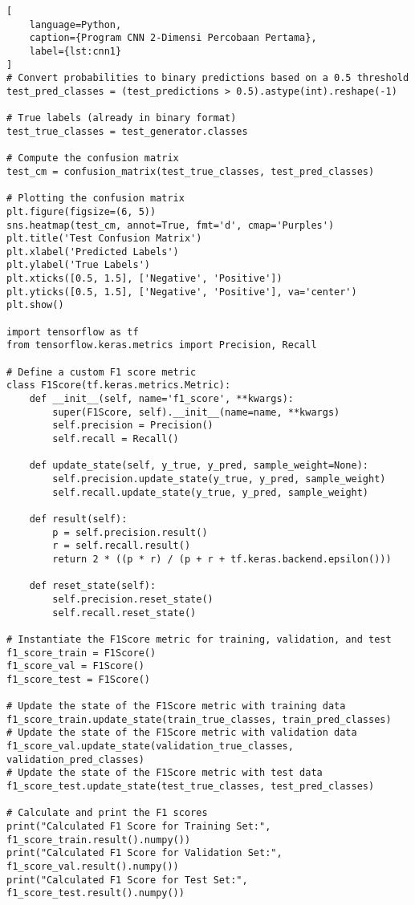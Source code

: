 \begin{lstlisting}[
    language=Python,
    caption={Program CNN 2-Dimensi Percobaan Pertama},
    label={lst:cnn1}
]
# Convert probabilities to binary predictions based on a 0.5 threshold
test_pred_classes = (test_predictions > 0.5).astype(int).reshape(-1)

# True labels (already in binary format)
test_true_classes = test_generator.classes

# Compute the confusion matrix
test_cm = confusion_matrix(test_true_classes, test_pred_classes)

# Plotting the confusion matrix
plt.figure(figsize=(6, 5))
sns.heatmap(test_cm, annot=True, fmt='d', cmap='Purples')
plt.title('Test Confusion Matrix')
plt.xlabel('Predicted Labels')
plt.ylabel('True Labels')
plt.xticks([0.5, 1.5], ['Negative', 'Positive'])
plt.yticks([0.5, 1.5], ['Negative', 'Positive'], va='center')
plt.show()

import tensorflow as tf
from tensorflow.keras.metrics import Precision, Recall

# Define a custom F1 score metric
class F1Score(tf.keras.metrics.Metric):
    def __init__(self, name='f1_score', **kwargs):
        super(F1Score, self).__init__(name=name, **kwargs)
        self.precision = Precision()
        self.recall = Recall()

    def update_state(self, y_true, y_pred, sample_weight=None):
        self.precision.update_state(y_true, y_pred, sample_weight)
        self.recall.update_state(y_true, y_pred, sample_weight)

    def result(self):
        p = self.precision.result()
        r = self.recall.result()
        return 2 * ((p * r) / (p + r + tf.keras.backend.epsilon()))

    def reset_state(self):
        self.precision.reset_state()
        self.recall.reset_state()

# Instantiate the F1Score metric for training, validation, and test
f1_score_train = F1Score()
f1_score_val = F1Score()
f1_score_test = F1Score()

# Update the state of the F1Score metric with training data
f1_score_train.update_state(train_true_classes, train_pred_classes)
# Update the state of the F1Score metric with validation data
f1_score_val.update_state(validation_true_classes, validation_pred_classes)
# Update the state of the F1Score metric with test data
f1_score_test.update_state(test_true_classes, test_pred_classes)

# Calculate and print the F1 scores
print("Calculated F1 Score for Training Set:", f1_score_train.result().numpy())
print("Calculated F1 Score for Validation Set:", f1_score_val.result().numpy())
print("Calculated F1 Score for Test Set:", f1_score_test.result().numpy())


\end{lstlisting}

